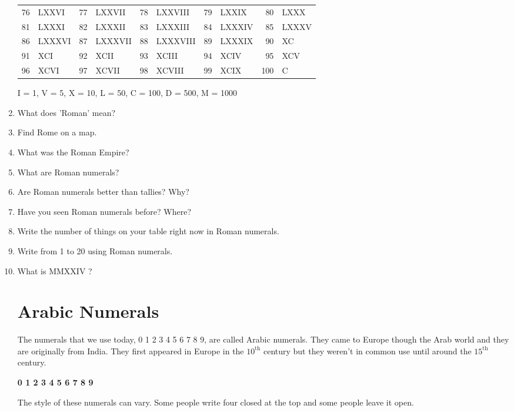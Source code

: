 \documentclass{article}
\begin{document}
\begin{enumerate}
\begin{center}
\begin{tabular}{rlrlrlrlrl}
			76 & LXXVI  & 77 & LXXVII  & 78 & LXXVIII  & 79 & LXXIX  & 80 & LXXX \\
			81 & LXXXI  & 82 & LXXXII  & 83 & LXXXIII  & 84 & LXXXIV & 85 & LXXXV\\
			86 & LXXXVI & 87 & LXXXVII & 88 & LXXXVIII & 89 & LXXXIX & 90 & XC   \\
			91 & XCI    & 92 & XCII    & 93 & XCIII    & 94 & XCIV   & 95 & XCV  \\
			96 & XCVI   & 97 & XCVII   & 98 & XCVIII   & 99 & XCIX   & 100& C    \\
		\end{tabular}
\end{center}
\begin{center}
    \scriptsize
    I = 1, V = 5, X = 10, L = 50, C = 100, D = 500, M = 1000
\end{center}

\newpage

\item What does 'Roman' mean?
\item Find Rome on a map.
\item What was the Roman Empire?
\item What are Roman numerals?
\item Are Roman numerals better than tallies? Why?
\item Have you seen Roman numerals before? Where?
\item Write the number of things on your table right now in Roman numerals.
\item Write from 1 to 20 using Roman numerals.
\item What is MMXXIV ?

\newpage

\section*{Arabic Numerals}
The numerals that we use today, 0 1 2 3 4 5 6 7 8 9, are called Arabic numerals. They came to Europe though the Arab world and they are originally from India. They first appeared in Europe in the $10^{\textrm{th}}$ century but they weren't in common use until around the $15^{\textrm{th}}$ century.\\
\begin{center}
{\Huge \textbf{0 1 2 3 4 5 6 7 8 9}}
\end{center}

The style of these numerals can vary. Some people write four closed at the top and some people leave it open.


\end{enumerate}
\end{document}
